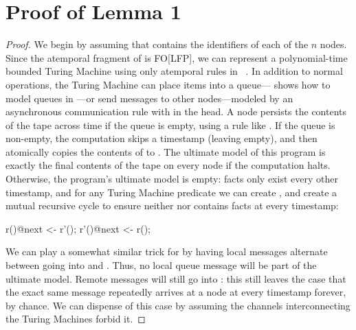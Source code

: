 \section{Proof of Lemma 1}

\begin{proof}
We begin by assuming that  contains the identifiers of each of the $n$ nodes.  Since the atemporal fragment of \lang is FO[LFP], we can represent a polynomial-time bounded Turing Machine using only atemporal rules in \lang~\cite{immerman-ptime}.  In addition to normal operations, the Turing Machine can place items into a queue---\cite{dedalus} shows how to model queues in \lang---or send messages to other nodes---modeled by an asynchronous communication rule with  in the head.  A node persists the contents of the tape across time if the queue is empty, using a rule like .  If the queue is non-empty, the computation skips a timestamp (leaving  empty), and then atomically copies the contents of  to .  The ultimate model of this program is exactly the final contents of the tape on every node if the computation halts.  Otherwise, the program's ultimate model is empty:  facts only exist every other timestamp, and for any Turing Machine predicate  we can create , and create a mutual recursive cycle to ensure neither  nor  contains facts at every timestamp:

\begin{Dedalus}
r()@next <- r'();
r'()@next <- r();
\end{Dedalus}

We can play a somewhat similar trick for  by having local messages alternate between going into  and .  Thus, no local queue message will be part of the ultimate model.  Remote messages will still go into : this still leaves the case that the exact same message repeatedly arrives at a node at every timestamp forever, by chance.  We can dispense of this case by assuming the channels interconnecting the Turing Machines forbid it.
\end{proof}

